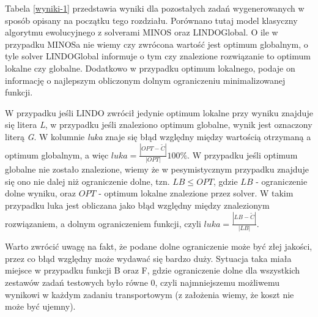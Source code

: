 Tabela \ref{wyniki-1} przedstawia wyniki dla pozostałych zadań wygenerowanych w sposób opisany na początku tego rozdziału. Porównano tutaj model klasyczny 
algorytmu ewolucyjnego z solverami MINOS oraz LINDOGlobal. O ile w przypadku MINOSa nie wiemy czy zwrócona wartość jest optimum globalnym, o tyle 
solver LINDOGlobal informuje o tym czy znalezione rozwiązanie to optimum lokalne czy globalne. Dodatkowo w przypadku optimum lokalnego, podaje on 
informację o najlepszym obliczonym dolnym ograniczeniu minimalizowanej funkcji. 

W przypadku jeśli LINDO zwrócił jedynie optimum lokalne przy wyniku znajduje się litera \textit{L}, w przypadku jeśli znaleziono optimum globalne, 
wynik jest oznaczony literą \textit{G}. W kolumnie \textit{luka} znaje się błąd względny między wartością otrzymaną a optimum globalnym, 
a więc $luka = \frac{|OPT - \tilde{C}|}{|OPT|} 100 \%$. W przypadku jeśli optimum globalne nie zostało znalezione, wiemy że w pesymistycznym 
przypadku znajduje się ono nie dalej niż ograniczenie dolne, tzn. $LB \le OPT$, gdzie $LB$ - ograniczenie dolne wyniku, oraz $OPT$ - optimum 
lokalne znalezione przez solver. W takim przypadku luka jest obliczana jako błąd względny między znalezionym rozwiązaniem, a dolnym ograniczeniem 
funkcji, czyli $luka = \frac{|LB - \tilde{C}|}{|LB|}$. 

Warto zwrócić uwagę na fakt, że podane dolne ograniczenie może być złej jakości, przez co błąd względny może wydawać się bardzo duży. Sytuacja 
taka miała miejsce w przypadku funkcji B oraz F, gdzie ograniczenie dolne dla wszystkich zestawów zadań testowych było równe $0$, czyli najmniejszemu 
możliwemu wynikowi w każdym zadaniu transportowym (z założenia wiemy, że koszt nie może być ujemny).

\newpage

